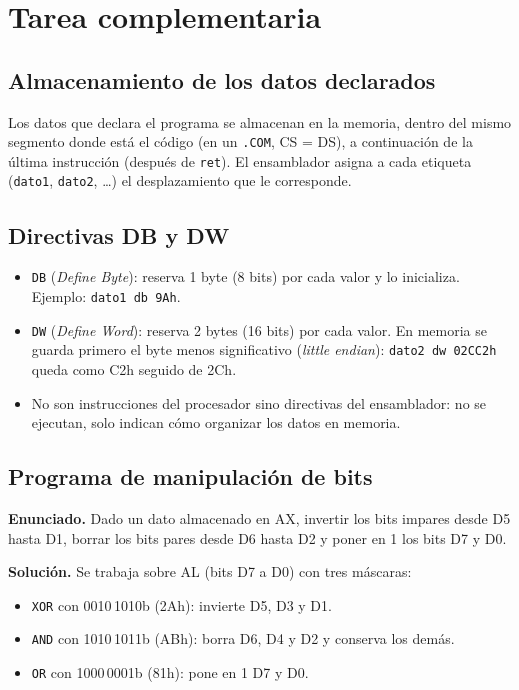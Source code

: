 \documentclass[10pt]{article}
\begin{document}
\section{Tarea complementaria}
 
\subsection{Almacenamiento de los datos declarados}
 
Los datos que declara el programa se almacenan en la memoria, dentro del mismo segmento donde está el código (en un \texttt{.COM}, CS = DS), a continuación de la última instrucción (después de \texttt{ret}). El ensamblador asigna a cada etiqueta (\texttt{dato1}, \texttt{dato2}, \ldots) el desplazamiento que le corresponde.
 
\subsection{Directivas DB y DW}
 
\begin{itemize}
  \item \texttt{DB} (\textit{Define Byte}): reserva 1 byte (8 bits) por cada valor y lo inicializa. Ejemplo: \texttt{dato1 db 9Ah}.
  \item \texttt{DW} (\textit{Define Word}): reserva 2 bytes (16 bits) por cada valor. En memoria se guarda primero el byte menos significativo (\textit{little endian}): \texttt{dato2 dw 02CC2h} queda como C2h seguido de 2Ch.
  \item No son instrucciones del procesador sino directivas del ensamblador: no se ejecutan, solo indican cómo organizar los datos en memoria.
\end{itemize}
 
\subsection{Programa de manipulación de bits}
 
\textbf{Enunciado.} Dado un dato almacenado en AX, invertir los bits impares desde D5 hasta D1, borrar los bits pares desde D6 hasta D2 y poner en 1 los bits D7 y D0.
 
\textbf{Solución.} Se trabaja sobre AL (bits D7 a D0) con tres máscaras:
\begin{itemize}
  \item \texttt{XOR} con 0010\,1010b (2Ah): invierte D5, D3 y D1.
  \item \texttt{AND} con 1010\,1011b (ABh): borra D6, D4 y D2 y conserva los demás.
  \item \texttt{OR} con 1000\,0001b (81h): pone en 1 D7 y D0.
\end{itemize}
 
\end{document}
